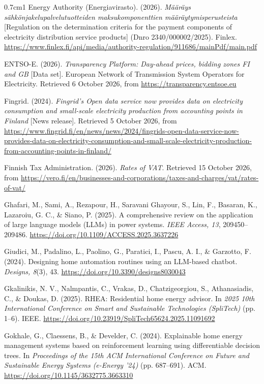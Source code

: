 \documentclass[12pt,a4paper]{report}
\begin{document}
\begin{hangparas}{0.7cm}{1}
Energy Authority (Energiavirasto). (2026). \textit{Määräys
sähkönjakelupalvelutuotteiden maksukomponenttien
määräytymisperusteista} [Regulation on the determination criteria for
the payment components of electricity distribution service products]
(Dnro 2340/000002/2025). Finlex.
\url{https://www.finlex.fi/api/media/authority-regulation/911686/mainPdf/main.pdf}

ENTSO-E. (2026). \textit{Transparency Platform: Day-ahead prices,
bidding zones FI and GB} [Data set]. European Network of Transmission System
Operators for Electricity. Retrieved 6 October 2026, from
\url{https://transparency.entsoe.eu}

Fingrid. (2024). \textit{Fingrid's Open data service now provides data on
electricity consumption and small-scale electricity production from
accounting points in Finland} [News release]. Retrieved 5 October 2026,
from
\url{https://www.fingrid.fi/en/news/news/2024/fingrids-open-data-service-now-provides-data-on-electricity-consumption-and-small-scale-electricity-production-from-accounting-points-in-finland/}

Finnish Tax Administration. (2026). \textit{Rates of VAT}. Retrieved
15 October 2026, from
\url{https://vero.fi/en/businesses-and-corporations/taxes-and-charges/vat/rates-of-vat/}

Ghafari, M., Sami, A., Rezapour, H., Saravani Ghayour, S., Lin, F.,
Basaran, K., Lazaroiu, G. C., \& Siano, P. (2025). A comprehensive review
on the application of large language models (LLMs) in power systems.
\textit{IEEE Access, 13}, 209450--209486.
\url{https://doi.org/10.1109/ACCESS.2025.3637226}

Giudici, M., Padalino, L., Paolino, G., Paratici, I., Pascu, A. I., \&
Garzotto, F. (2024). Designing home automation routines using an
LLM-based chatbot. \textit{Designs, 8}(3), 43.
\url{https://doi.org/10.3390/designs8030043}

Gkalinikis, N. V., Nalmpantis, C., Vrakas, D., Chatzigeorgiou, S.,
Athanasiadis, C., \& Doukas, D. (2025). RHEA: Residential home energy
advisor. In \textit{2025 10th International Conference on Smart and
Sustainable Technologies (SpliTech)} (pp. 1--6). IEEE.
\url{https://doi.org/10.23919/SpliTech65624.2025.11091692}

Gokhale, G., Claessens, B., \& Develder, C. (2024). Explainable home
energy management systems based on reinforcement learning using
differentiable decision trees. In \textit{Proceedings of the 15th ACM
International Conference on Future and Sustainable Energy Systems
(e-Energy '24)} (pp. 687--691). ACM.
\url{https://doi.org/10.1145/3632775.3663310}


\end{hangparas}
\end{document}
